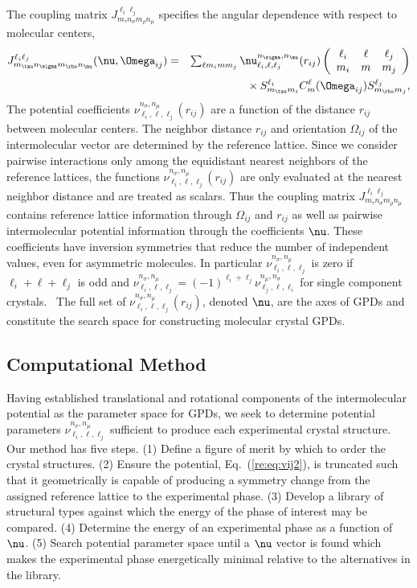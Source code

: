 \documentclass[preprint]{iucr}              %
\newcommand{\mb}[1]{\ensuremath{\mbox{\boldmath $ #1 $}}}
\begin{document}
The coupling matrix $J_{m_\tau n_\sigma m_\rho n_\mu}^{\ell_i
\ell_j}$ specifies the angular dependence with respect to molecular
centers,
\begin{eqnarray}
\label{coupling} J_{m_\tau n_\sigma m_\rho n_\mu}^{\ell_i
\ell_j}(\mb{\nu},\mb{\Omega}_{ij})&=&\sum_{\ell m_i m m_j}
\nu_{\ell_i,\ell,\ell_j}^{n_\sigma,n_\mu}(r_{ij})\left(\begin{array}{ccc}
 \ell_i & \ell & \ell_j \\ m_i & m & m_j
\end{array}\right)\nonumber\\
&&{}\times S^{\ell_i}_{m_\tau m_i}C_{m}^{\ell}(\mb{\Omega}_{ij})
S^{\ell_j}_{m_\rho m_j},
\end{eqnarray}
The potential coefficients
$\nu_{\ell_i,\ell,\ell_j}^{n_\sigma,n_\mu}(r_{ij})$ are a function
of the distance $r_{ij}$ between molecular centers. The neighbor
distance $r_{ij}$ and orientation $\Omega_{ij}$ of the
intermolecular vector are determined by the reference lattice. Since
we consider pairwise interactions only among the equidistant nearest
neighbors of the reference lattices, the functions
$\nu_{\ell_i,\ell,\ell_j}^{n_\sigma,n_\mu}(r_{ij})$ are only
evaluated at the nearest neighbor distance and are treated as
scalars. Thus the coupling matrix $J_{m_\tau n_\sigma m_\rho
n_\mu}^{\ell_i \ell_j}$ contains reference lattice information
through $\Omega_{ij}$ and $r_{ij}$ as well as pairwise
intermolecular potential information through the coefficients
$\mb{\nu}$. These coefficients have inversion symmetries that reduce
the number of independent values, even for asymmetric molecules.  In
particular $\nu_{\ell_i,\ell,\ell_j}^{n_\sigma,n_\mu}$ is zero if
$\ell_i+\ell+\ell_j$ is odd and
$\nu_{\ell_i,\ell,\ell_j}^{n_\sigma,n_\mu}=
(-1)^{\ell_i+\ell_j}\nu_{\ell_j,\ell,\ell_i}^{n_\mu,n_\sigma}$ for
single component crystals.~\cite{Avoird80} The full set of
$\nu_{\ell_i,\ell,\ell_j}^{n_\sigma,n_\mu}(r_{ij})$, denoted
$\mb{\nu}$, are the axes of GPDs and constitute the search space for constructing molecular crystal GPDs.

\subsection{Computational Method}
\label{Computational_Strategy}

Having established translational and rotational components of the
intermolecular potential as the parameter space for GPDs, we seek to
determine potential parameters
$\nu_{\ell_i,\ell,\ell_j}^{n_\sigma,n_\mu}$ sufficient to produce
each experimental crystal structure. Our method has five steps. (1)
Define a figure of merit by which to order the crystal structures. (2)
Ensure the potential, Eq.~(\ref{re:eq:vij2}), is truncated such that
it geometrically is capable of producing a symmetry change from the
assigned reference lattice to the experimental phase. (3) Develop a
library of structural types against which the energy of the phase of interest may be
compared. (4) Determine the energy of an experimental phase as a
function of $\mb{\nu}$. (5) Search potential parameter space until a
$\mb{\nu}$ vector is found which makes the experimental phase
energetically minimal relative to the alternatives in the library.
\end{document}

